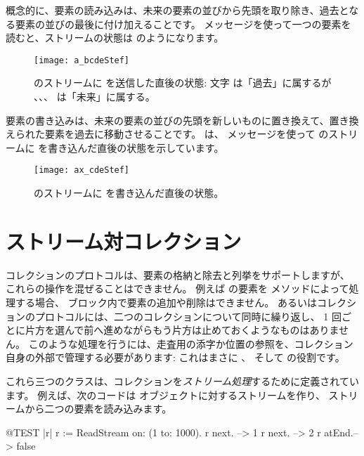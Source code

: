 \documentclass[a4paper,10pt,twoside]{book}
\begin{document}
概念的に、要素の読み込みは、未来の要素の並びから先頭を取り除き、過去となる要素の並びの最後に付け加えることです。
 メッセージを使って一つの要素を読むと、ストリームの状態は のようになります。

\begin{figure}[ht]
\centerline{\texttt{[image: a\_bcdeStef]}}
\caption{ のストリームに  を送信した直後の状態: 文字  は「過去」に属するが 、、、 は「未来」に属する。}
\vspace{.2in}
\end{figure}

要素の書き込みは、未来の要素の並びの先頭を新しいものに置き換えて、置き換えられた要素を過去に移動させることです。
 は、  メッセージを使って のストリームに  を書き込んだ直後の状態を示しています。

\begin{figure}[ht]
\centerline{\texttt{[image: ax\_cdeStef]}}
\caption{ のストリームに  を書き込んだ直後の状態。}
\vspace{.2in}
\end{figure}

\section{ストリーム対コレクション}

コレクションのプロトコルは、要素の格納と除去と列挙をサポートしますが、
これらの操作を混ぜることはできません。
例えば  の要素を  メソッドによって処理する場合、
 ブロック内で要素の追加や削除はできません。
あるいはコレクションのプロトコルには、二つのコレクションについて同時に繰り返し、
1  回ごとに片方を選んで前へ進めながらもう片方は止めておくようなものはありません。
このような処理を行うには、走査用の添字か位置の参照を、コレクション自身の外部で管理する必要があります:
これはまさに 、 そして  の役割です。

これら三つのクラスは、コレクションを\emph{ストリーム処理}するために定義されています。
例えば、次のコードは  オブジェクトに対するストリームを作り、
ストリームから二つの要素を読み込みます。
\begin{code}{@TEST |r|}
r := ReadStream on: (1 to: 1000).
r next.   --> 1
r next.   --> 2
r atEnd.--> false
\end{code}
\end{document}
